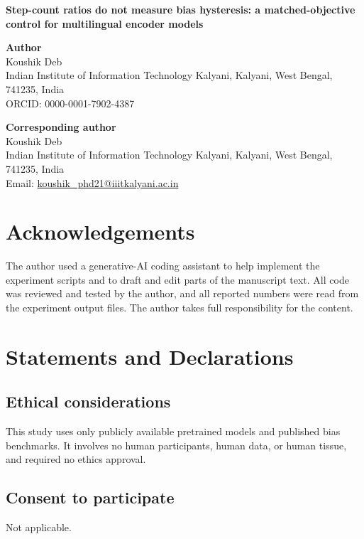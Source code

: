 \documentclass[12pt]{article}
\begin{document}
\begin{center}
{\Large\bfseries Step-count ratios do not measure bias hysteresis: a matched-objective control for multilingual encoder models}
\end{center}

\vspace{1em}

\noindent\textbf{Author}\\
Koushik Deb\\
Indian Institute of Information Technology Kalyani, Kalyani, West Bengal, 741235, India\\
ORCID: 0000-0001-7902-4387

\vspace{1em}

\noindent\textbf{Corresponding author}\\
Koushik Deb\\
Indian Institute of Information Technology Kalyani, Kalyani, West Bengal, 741235, India\\
Email: \href{mailto:koushik_phd21@iiitkalyani.ac.in}{koushik\_phd21@iiitkalyani.ac.in}

\vspace{1.5em}

\section*{Acknowledgements}
The author used a generative-AI coding assistant to help implement the experiment scripts and to draft and edit parts of the manuscript text. All code was reviewed and tested by the author, and all reported numbers were read from the experiment output files. The author takes full responsibility for the content.

\section*{Statements and Declarations}

\subsection*{Ethical considerations}
This study uses only publicly available pretrained models and published bias benchmarks. It involves no human participants, human data, or human tissue, and required no ethics approval.

\subsection*{Consent to participate}
Not applicable.
\end{document}
